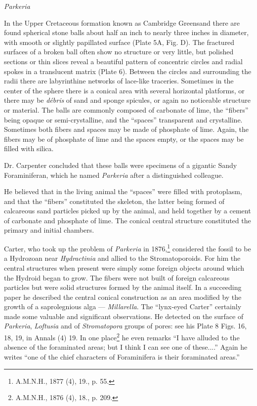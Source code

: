 \documentclass[a4paper, 12pt, oneside, landscape]{article}
\begin{document}
\bigskip
\centerline{\emph{Parkeria}}

In the Upper Cretaceous formation known as Cambridge Greensand there are found spherical stone balls about half an inch to nearly three inches in diameter, with smooth or slightly papillated surface (Plate 5A, Fig. D). The fractured surfaces of a broken ball often show no structure or very little, but polished sections or thin slices reveal a beautiful pattern of concentric circles and radial spokes in a translucent matrix (Plate 6). Between the circles and surrounding the radii there are labyrinthine networks of lace-like traceries. Sometimes in the center of the sphere there is a conical area with several horizontal platforms, or there may be \emph{débris} of sand and sponge spicules, or again no noticeable structure or material. The balls are commonly composed of carbonate of lime, the ``fibers'' being opaque or semi-crystalline, and the ``spaces'' transparent and crystalline. Sometimes both fibers and spaces may be made of phosphate of lime. Again, the fibers may be of phosphate of lime and the spaces empty, or the spaces may be filled with silica.

Dr. Carpenter concluded that these balls were specimens of a gigantic Sandy Foraminiferan, which he named \emph{Parkeria} after a distinguished colleague.

He believed that in the living animal the ``spaces'' were filled with protoplasm, and that the ``fibers'' constituted the skeleton, the latter being formed of calcareous sand particles picked up by the animal, and held together by a cement of carbonate and phosphate of lime. The conical central structure constituted the primary and initial chambers.

Carter, who took up the problem of \emph{Parkeria} in 1876,\footnote{A.M.N.H., 1877 (4), 19., p. 55.} considered the fossil to be a Hydrozoan near \emph{Hydractinia} and allied to the Stromatoporoids. For him the central structures when present were simply some foreign objects around which the Hydroid began to grow. The fibers were not built of foreign calcareous particles but were solid structures formed by the animal itself. In a succeeding paper he described the central conical construction as an area modified by the growth of a saprolegnious alga --- \emph{Millarella}. The ``lynx-eyed Carter'' certainly made some valuable and significant observations. He detected on the surface of \emph{Parkeria}, \emph{Loftusia} and of \emph{Stromatopora} groups of pores: see his Plate 8 Figs. 16, 18, 19, in Annals (4) 19. In one place\footnote{A.M.N.H., 1876 (4), 18., p. 209.} he even remarks ``I have alluded to the absence of the foraminated areas; but I think I can see one of these....'' Again he writes ``one of the chief characters of Foraminifera is their foraminated areas.''
\end{document}
